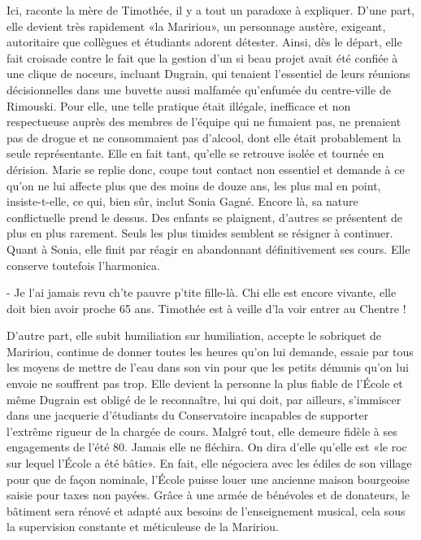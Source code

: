 Ici, raconte la mère de Timothée, il y a tout un paradoxe à expliquer. D’une part, elle devient très rapidement «la Maririou», un personnage austère, exigeant, autoritaire que collègues et étudiants adorent détester. Ainsi, dès le départ, elle fait croisade contre le fait que la gestion d’un si beau projet avait été confiée à une clique de noceurs, incluant Dugrain, qui tenaient l’essentiel de leurs réunions décisionnelles dans une buvette aussi malfamée qu’enfumée du centre-ville de Rimouski. Pour elle, une telle pratique était illégale, inefficace et non respectueuse auprès des membres de l’équipe qui ne fumaient pas, ne prenaient pas de drogue et ne consommaient pas d’alcool, dont elle était probablement la seule représentante. Elle en fait tant, qu’elle se retrouve isolée et tournée en dérision. Marie se replie donc, coupe tout contact non essentiel et demande à ce qu’on ne lui affecte plus que des moins de douze ans, les plus mal en point, insiste-t-elle, ce qui, bien sûr, inclut Sonia Gagné. Encore là, sa nature conflictuelle prend le dessus. Des enfants se plaignent, d’autres se présentent de plus en plus rarement. Seuls les plus timides semblent se résigner à continuer. Quant à Sonia, elle finit par réagir en abandonnant définitivement ses cours. Elle conserve toutefois l’harmonica.

- Je l’ai jamais revu ch’te pauvre p’tite fille-là. Chi elle est encore vivante, elle doit bien avoir proche 65 ans. Timothée est à veille d’la voir entrer au Chentre !

D’autre part, elle subit humiliation sur humiliation, accepte le sobriquet de Maririou, continue de donner toutes les heures qu’on lui demande, essaie par tous les moyens de mettre de l’eau dans son vin pour que les petits démunis qu’on lui envoie ne souffrent pas trop. Elle devient la personne la plus fiable de l’École et même Dugrain est obligé de le reconnaître, lui qui doit, par ailleurs, s’immiscer dans une jacquerie d’étudiants du Conservatoire incapables de supporter l’extrême rigueur de la chargée de cours. Malgré tout, elle demeure fidèle à ses engagements de l’été 80. Jamais elle ne fléchira. On dira d’elle qu’elle est «le roc sur lequel l’École a été bâtie». En fait, elle négociera avec les édiles de son village pour que de façon nominale, l’École puisse louer une ancienne maison bourgeoise saisie pour taxes non payées. Grâce à une armée de bénévoles et de donateurs, le bâtiment sera rénové et adapté aux besoins de l’enseignement musical, cela sous la supervision constante et méticuleuse de la Maririou.

